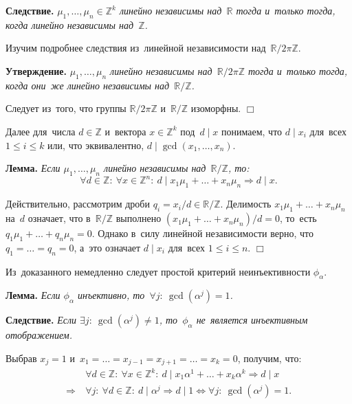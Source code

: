 \documentclass[twoside]{article}
\begin{document}
\medskip\noindent\textbf{Следствие.}\emph{
    $\mu_1, \ldots, \mu_n \in \mathbb{Z}^k$ линейно независимы над~$\mathbb{R}$ тогда и~только тогда, когда линейно независимы над~$\mathbb{Z}$.
}\medskip

Изучим подробнее следствия из~линейной независимости над~$\mathbb{R} / 2 \pi \mathbb{Z}$.

\medskip\noindent\textbf{Утверждение.}\emph{
    $\mu_1, \ldots, \mu_n$ линейно независимы над~$\mathbb{R} / 2 \pi \mathbb{Z}$
    тогда и~только тогда, когда они~же линейно независимы над~$\mathbb{R} / \mathbb{Z}$.
}\medskip

    Следует из~того, что группы $\mathbb{R} / 2 \pi \mathbb{Z}$ и~$\mathbb{R} / \mathbb{Z}$ изоморфны.
\hfill$\Box$\medskip

Далее для~числа $d \in \mathbb{Z}$ и~вектора $x \in \mathbb{Z}^k$ под~$d \mid x$ понимаем, что $d \mid x_i$ для~всех $1 \leq i \leq k$
или, что эквивалентно, $d \mid \gcd(x_1, \ldots, x_n)$.

\medskip\noindent\textbf{Лемма.}\emph{
    Если $\mu_1, \ldots, \mu_n$ линейно независимы над~$\mathbb{R} / \mathbb{Z}$, то:
    $$
        \forall d \in \mathbb{Z}{:}\ \forall x \in \mathbb{Z}^n{:}\ d \mid x_1 \mu_1 + \ldots + x_n \mu_n \Rightarrow d \mid x.
    $$
}

    Действительно, рассмотрим дроби $q_i = x_i / d \in \mathbb{R} / \mathbb{Z}$. Делимость $x_1 \mu_1 + \ldots + x_n \mu_n$ на~$d$ означает,
    что в~$\mathbb{R} / \mathbb{Z}$ выполнено $(x_1 \mu_1 + \ldots + x_n \mu_n) / d = 0$, то~есть $q_1 \mu_1 + \ldots + q_n \mu_n = 0$.
    Однако в~силу линейной независимости верно, что $q_1 = \ldots = q_n = 0$, а~это означает $d \mid x_i$ для~всех $1 \leq i \leq n$.
\hfill$\Box$\medskip

Из~доказанного немедленно следует простой критерий неинъективности $\phi_\alpha$.

\medskip\noindent\textbf{Лемма.}\emph{
    Если $\phi_\alpha$ инъективно, то~$\forall j{:}\ \gcd(\alpha^j) = 1$.
}

\medskip\noindent\textbf{Следствие.}\emph{
    Если $\exists j{:}\ \gcd(\alpha^j) \neq 1$, то~$\phi_\alpha$ не~является инъективным отображением.
}\medskip

    Выбрав $x_j = 1$ и~$x_1 = \ldots = x_{j - 1} = x_{j + 1} = \ldots = x_k = 0$, получим, что:
    \begin{align*}
                         & \forall d \in \mathbb{Z}{:}\ \forall x \in \mathbb{Z}^k{:}\ d \mid x_1 \alpha^1 + \ldots + x_k \alpha^k \Rightarrow d \mid x \\
            \Rightarrow\ & \forall j{:}\ \forall d \in \mathbb{Z}{:}\ d \mid \alpha^j \Rightarrow d \mid 1
        \Leftrightarrow \forall j{:}\ \gcd(\alpha^j) = 1.
        \tag*{$\Box$}
    \end{align*}
{}
\end{document}
